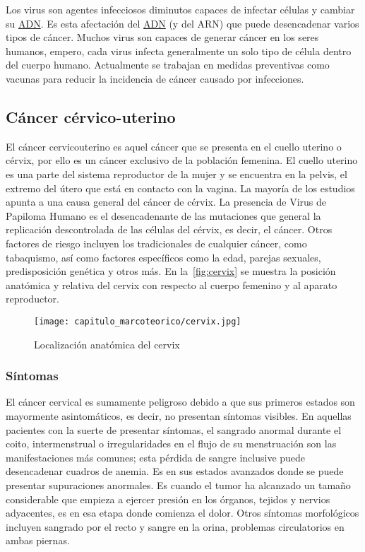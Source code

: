 Los virus son agentes infecciosos diminutos capaces de infectar células y
cambiar su \hyperlink{abbr}{ADN}. Es esta afectación del \hyperlink{abbr}{ADN}
(y del ARN) que puede desencadenar varios tipos de cáncer. Muchos virus son
capaces de generar cáncer en los seres humanos, empero, cada virus infecta
generalmente un solo tipo de célula dentro del cuerpo humano. Actualmente se
trabajan en medidas preventivas como vacunas para reducir la incidencia de
cáncer causado por infecciones. 

\subsection{Cáncer cérvico-uterino}

El cáncer cervicouterino es aquel cáncer que se
presenta en el cuello uterino o cérvix, por ello es un cáncer exclusivo de la
población femenina. El cuello uterino es una parte del sistema reproductor de la
mujer y se encuentra en la pelvis, el extremo del útero que está en contacto con
la vagina. La mayoría de los estudios apunta a una causa general del cáncer de
cérvix. La presencia de Virus de Papiloma Humano es el desencadenante de las
mutaciones que general la replicación descontrolada de las células del cérvix,
es decir, el cáncer. Otros factores de riesgo incluyen los tradicionales de
cualquier cáncer, como tabaquismo, así como factores específicos como la edad,
parejas sexuales, predisposición genética y otros más. En
la~\autoref{fig:cervix} se muestra la posición anatómica y relativa del cervix
con respecto al cuerpo femenino y al aparato reproductor.

\begin{figure}[H]
    \centering
    \texttt{[image: capitulo\_marcoteorico/cervix.jpg]}
    \caption{Localización anatómica del cervix}\label{fig:cervix}
\end{figure}


\subsubsection{Síntomas}

El cáncer cervical es sumamente peligroso debido a que sus primeros estados son
mayormente asintomáticos, es decir, no presentan síntomas visibles. En aquellas
pacientes con la suerte de presentar síntomas, el sangrado anormal durante el
coito, intermenstrual o irregularidades en el flujo de su menstruación son las
manifestaciones más comunes; esta pérdida de sangre inclusive puede desencadenar
cuadros de anemia. Es en sus estados avanzados donde se puede presentar
supuraciones anormales. Es cuando el tumor ha alcanzado un tamaño considerable
que empieza a ejercer presión en los órganos, tejidos y nervios  adyacentes, es
en esa etapa donde comienza el dolor. Otros síntomas morfológicos incluyen
sangrado por el recto y sangre en la orina, problemas circulatorios en ambas
piernas. 

